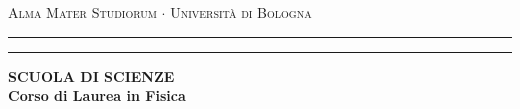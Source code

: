 \begin{center}
{
	{\Large
		{\textsc{Alma Mater Studiorum $\cdot$ Università di Bologna}}
	}
}
\rule[0.1cm]{18cm}{0.1mm}
\rule[0.5cm]{18cm}{0.6mm}
{\small
	{\bf SCUOLA DI SCIENZE\\
		Corso di Laurea in Fisica
	}
}
{\let\newpage\relax\maketitle}
\end{center}